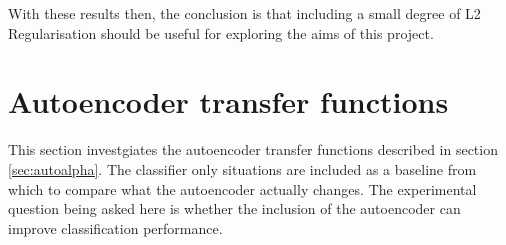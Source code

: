     With these results then, the conclusion is that including a small degree of L2
    Regularisation should be useful for exploring the aims of this project.


    \section{Autoencoder transfer functions}
    This section investgiates the autoencoder transfer functions described in section \ref{sec:autoalpha}.
    The classifier only situations are included as a baseline from which to compare
    what the autoencoder actually changes. The experimental question being asked here
    is whether the inclusion of the autoencoder can improve classification performance.



